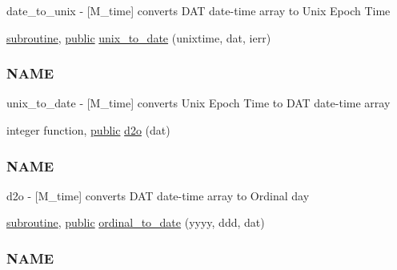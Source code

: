 \begin{DoxyCompactItemize}
\begin{DoxyCompactList}
date\+\_\+to\+\_\+unix -\/ \mbox{[}M\+\_\+time\mbox{]} converts D\+AT date-\/time array to Unix Epoch Time \end{DoxyCompactList}\item 
\hyperlink{M__stopwatch_83_8txt_acfbcff50169d691ff02d4a123ed70482}{subroutine}, \hyperlink{M__stopwatch_83_8txt_a2f74811300c361e53b430611a7d1769f}{public} \hyperlink{namespacem__time_acc62ada23f8fa2fe67b428702fbcbf1c}{unix\+\_\+to\+\_\+date} (unixtime, dat, ierr)
\begin{DoxyCompactList}\small\item\em \subsubsection*{N\+A\+ME}

unix\+\_\+to\+\_\+date -\/ \mbox{[}M\+\_\+time\mbox{]} converts Unix Epoch Time to D\+AT date-\/time array \end{DoxyCompactList}\item 
integer function, \hyperlink{M__stopwatch_83_8txt_a2f74811300c361e53b430611a7d1769f}{public} \hyperlink{namespacem__time_a727dd77bbd4a5d0e3947c5d303845947}{d2o} (dat)
\begin{DoxyCompactList}\small\item\em \subsubsection*{N\+A\+ME}

d2o -\/ \mbox{[}M\+\_\+time\mbox{]} converts D\+AT date-\/time array to Ordinal day \end{DoxyCompactList}\item 
\hyperlink{M__stopwatch_83_8txt_acfbcff50169d691ff02d4a123ed70482}{subroutine}, \hyperlink{M__stopwatch_83_8txt_a2f74811300c361e53b430611a7d1769f}{public} \hyperlink{namespacem__time_aa4dca4409bf20a011bb04988c1335d63}{ordinal\+\_\+to\+\_\+date} (yyyy, ddd, dat)
\begin{DoxyCompactList}\small\item\em \subsubsection*{N\+A\+ME}


\end{DoxyCompactList}
\end{DoxyCompactItemize}
